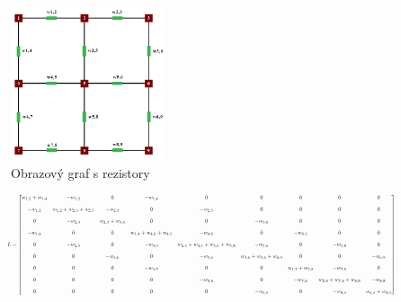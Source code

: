 \documentclass[czech, master, public, dept460, male, cpdeclaration, oneside]{diploma}
\begin{document}
\begin{figure}[H]
	\vspace*{+3.0mm}
	\centering
	\includegraphics[height=4.5cm]{Figures/explanatory/resistanceGraph.png}
	\caption{Obrazový graf s rezistory}
\end{figure}

\begin{equation}
\vspace*{+3.0mm}
\resizebox{.9\hsize}{!}{$
L= \begin{bmatrix} 
	w_{1,2} + w_{1,4} & -w_{1,2}  & 0 & -w_{1,4} & 0 & 0 & 0 & 0 & 0 \\[1em]
	-w_{1,2} & w_{1,2} + w_{2,3} + w_{2,5} & -w_{2,3} & 0 &  -w_{2,5} & 0 & 0 & 0 & 0 \\[1em]
	0 & -w_{2,3} & w_{2,3} + w_{3,6} & 0 & 0 & -w_{3,6} & 0 & 0 & 0 \\[1em]
	-w_{1,4}  & 0 & 0 & w_{1,4} + w_{4,5} + w_{4,7} &  -w_{4,5} & 0 & -w_{4,7} & 0 & 0 \\[1em]
	0 & -w_{2,5} & 0 & -w_{4,5} & w_{2,5} + w_{4,5} + w_{5,6} + w_{5,8} &  -w_{5,6} & 0 & -w_{5,8} & 0 \\[1em]
	0 & 0 & -w_{3,6} & 0 & - w_{5,6} & w_{3,6} + w_{5,6} + w_{6,9} & 0 & 0 & -w_{6,9} \\[1em]
	0 & 0 & 0 & -w_{4,7} & 0 & 0 & w_{4,7} + w_{7,8} & -w_{7,8}  & 0 \\[1em]
	0 & 0 & 0 & 0 & -w_{5,8} & 0 & -w_{7,8} & w_{5,8} + w_{7,8} + w_{8,9}  & -w_{8,9} \\[1em]
	0 & 0 & 0 & 0 & 0 & -w_{6,9} & 0 & -w_{8,9} & w_{6,9} + w_{8,9}
\end{bmatrix}
$}
\end{equation}
\end{document}
